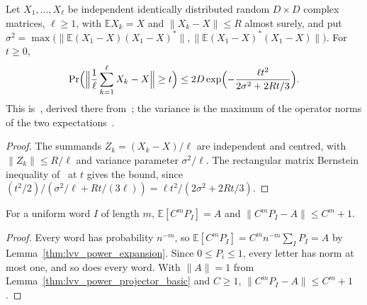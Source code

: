 \begin{lemma}
    \label{thm:lvv_matrix_bernstein}
    \leanok
    Let $X_1,\ldots,X_\ell$ be independent identically distributed random
    $D\times D$ complex matrices, $\ell\ge1$, with $\mathbb E X_k=X$ and
    $\|X_k-X\|\le R$ almost surely, and put
    $\sigma^2=\max\bigl(\|\mathbb E(X_1-X)(X_1-X)^*\|,
        \|\mathbb E(X_1-X)^*(X_1-X)\|\bigr)$. For $t\ge0$,
    \begin{align*}
        \Pr\Bigl(\Bigl\|\frac1\ell\sum_{k=1}^\ell X_k-X\Bigr\|\ge t\Bigr)
        \le2D\exp\Bigl(-\frac{\ell t^2}{2\sigma^2+2Rt/3}\Bigr).
    \end{align*}
    This is~\cite[lines 616--624]{Landau2015Polynomial}, derived there
    from~\cite[Theorem~1.6]{Tropp2012User}; the variance is the maximum of the
    operator norms of the two expectations~\cite{gap:lvv13_matrix_bernstein_variance_norm}.
\end{lemma}

\begin{proof}
    \leanok
    The summands $Z_k=(X_k-X)/\ell$ are independent and centred, with
    $\|Z_k\|\le R/\ell$ and variance parameter $\sigma^2/\ell$. The rectangular
    matrix Bernstein inequality of~\cite[Theorem~1.6]{Tropp2012User} at $t$
    gives the bound, since
    $(t^2/2)/(\sigma^2/\ell+Rt/(3\ell))=\ell t^2/(2\sigma^2+2Rt/3)$.
\end{proof}

\begin{lemma}
    \label{lem:lvv_sampled_term}
    \leanok
    For a uniform word $I$ of length $m$, $\mathbb E[C^mP_I]=A$ and
    $\|C^mP_I-A\|\le C^m+1$.
\end{lemma}

\begin{proof}
    \leanok
    Every word has probability $n^{-m}$, so
    $\mathbb E[C^mP_I]=C^mn^{-m}\sum_IP_I=A$ by
    Lemma~\ref{thm:lvv_power_expansion}. Since $0\le P_i\le1$, every letter
    has norm at most one, and so does every word. With $\|A\|=1$ from
    Lemma~\ref{thm:lvv_power_projector_basic} and $C\ge1$,
    $\|C^mP_I-A\|\le C^m+1$.
\end{proof}

